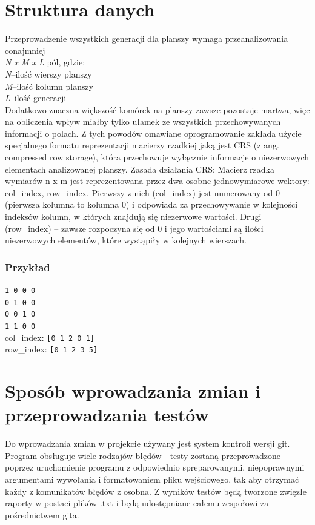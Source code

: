 \documentclass[11pt,a4paper]{report}
\begin{document}
\section{Struktura danych}\label{sec:teskt}
Przeprowadzenie wszystkich generacji dla planszy wymaga przeanalizowania conajmniej \\ \textsl{ N x M x L} pól, gdzie:\\
	\textsl{ N}--ilość wierszy planszy\\
 	\textsl{ M}--ilość kolumn planszy\\
	\textsl{ L}--ilość generacji\\
Dodatkowo znaczna większość komórek na planszy zawsze pozostaje martwa, więc na obliczenia wpływ miałby tylko ułamek ze wszystkich przechowywanych informacji o 
polach. Z tych powodów omawiane oprogramowanie zakłada użycie specjalnego formatu reprezentacji macierzy rzadkiej jaką jest CRS (z ang. compressed row storage), która
przechowuje wyłącznie informacje o niezerwowych elementach analizowanej planszy.
Zasada działania CRS:
Macierz rzadka wymiarów n x m jest reprezentowana przez dwa osobne jednowymiarowe wektory: col\_index, row\_index. Pierwszy z nich (col\_index) jest numerowany od 0 (pierwsza kolumna to kolumna 0) i odpowiada za przechowywanie w kolejności indeksów kolumn,
w których znajdują się niezerwowe wartości. Drugi (row\_index) -- zawsze rozpoczyna się od 0 i jego wartościami są ilości niezerwowych elementów, które wystąpiły w  kolejnych wierszach.
\subsubsection{Przykład}
\texttt{1 0 0 0}\\
\texttt{0 1 0 0}\\
\texttt{0 0 1 0}\\
\texttt{1 1 0 0}\\
col\_index: \texttt{[0 1 2 0 1]}\\
row\_index: \texttt{[0 1 2 3 5]}

\section{Sposób wprowadzania zmian i przeprowadzania testów}\label{sec:teskt}
Do wprowadzania zmian w projekcie używany jest system kontroli wersji git.
Program obsługuje wiele rodzajów błędów - testy zostaną przeprowadzone poprzez uruchomienie programu z odpowiednio spreparowanymi, niepoprawnymi argumentami wywołania i formatowaniem pliku wejściowego, tak aby otrzymać każdy z komunikatów błędów z osobna.
Z wyników testów będą tworzone zwięzłe raporty w postaci plików .txt i będą udostępniane całemu zespołowi za pośrednictwem gita.
\end{document}
